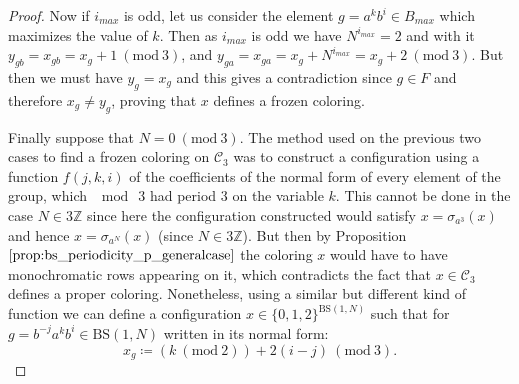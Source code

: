 \documentclass{aims}
\newcommand{\BS}[1][N]{\mathrm{BS}(1,#1)}
\theoremstyle{definition}
\begin{document}
\begin{proof}
	Now if $i_{max}$ is odd, let us consider the element $g=a^kb^i\in B_{max}$ which maximizes the value of $k$. Then as $i_{max}$ is odd we have $N^{i_{max}}=2$ and with it $y_{gb}=x_{gb}=x_g+1  \ (\mathrm{mod} \ 3)$, and $y_{ga}=x_{ga}=x_g+N^{i_{max}} = x_g+2  \ (\mathrm{mod} \ 3)$. But then we must have $y_g=x_g$ and this gives a contradiction since $g\in F$ and therefore $x_g\neq y_g$, proving that $x$ defines a frozen coloring.
	
	
	Finally suppose that $N=0 \ (\mathrm{mod} \ 3)$. The method used on the previous two cases to find a frozen coloring on $\mathcal{C}_3$ was to construct a configuration using a function $f(j,k,i)$ of the coefficients of the normal form of every element of the group, which $\mod \ 3$ had period $3$ on the variable $k$. This cannot be done in the case $N\in 3\mathbb{Z }$ since here the configuration constructed would satisfy $x=\sigma_{a^3}(x)$ and hence $x=\sigma_{a^N}(x)$ (since $N\in 3\mathbb{Z}$). But then by Proposition $\ref{prop:bs_periodicity_p_generalcase}$ the coloring $x$ would have to have monochromatic rows appearing on it, which contradicts the fact that $x\in \mathcal{C}_3$ defines a proper coloring. Nonetheless, using a similar but different kind of function we can define a configuration $x\in \{0,1,2\}^{\BS}$ such that for $g=b^{-j}a^k b^i\in \BS$ written in its normal form:
	$$
	x_g\coloneqq (k \ (\mathrm{mod} \ 2)) + 2(i-j) \ (\mathrm{mod} \ 3).
	$$
	

\end{proof}
\end{document}
